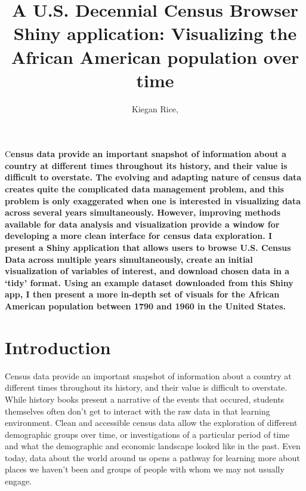 \documentclass[DIV=calc, paper=a4, fontsize=10pt, twocolumn]{scrartcl}\usepackage[]{graphicx}\usepackage[]{color}
\title{A U.S. Decennial Census Browser Shiny application: Visualizing the African American population over time} %
\author{Kiegan Rice, } %
\date{} %
\newcommand{\initial}[1]{ %
\lettrine[lines=3,lhang=0.3,nindent=0em]{
\color{black}
{\textsf{#1}}}{}}
\begin{document}


\maketitle %

\thispagestyle{fancy} %


\vspace{-1cm}


\initial{C}\textbf{ensus data provide an important snapshot of information about a country at different times throughout its history, and their value is difficult to overstate. The evolving and adapting nature of census data creates quite the complicated data management problem, and this problem is only exaggerated when one is interested in visualizing data across several years simultaneously. However, improving methods available for data analysis and visualization provide a window for developing a more clean interface for census data exploration. I present a Shiny application that allows users to browse U.S. Census Data across multiple years simultaneously, create an initial visualization of variables of interest, and download chosen data in a `tidy' format. Using an example dataset downloaded from this Shiny app, I then present a more in-depth set of visuals for the African American population between 1790 and 1960 in the United States.}  

\section*{Introduction}

Census data provide an important snapshot of information about a country at different times throughout its history, and their value is difficult to overstate.  While history books present a narrative of the events that occured, students themselves often don't get to interact with the raw data in that learning environment. Clean and accessible census data allow the exploration of different demographic groups over time, or investigations of a particular period of time and what the demographic and economic landscape looked like in the past. Even today, data about the world around us opens a pathway for learning more about places we haven't been and groups of people with whom we may not usually engage.  
\end{document}
